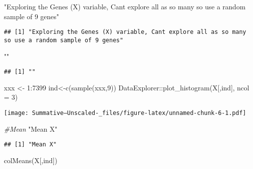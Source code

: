 \documentclass[
]{article}
\newenvironment{Shaded}{\begin{snugshade}}{\end{snugshade}}
\newcommand{\AttributeTok}[1]{\textcolor[rgb]{0.77,0.63,0.00}{#1}}
\newcommand{\CommentTok}[1]{\textcolor[rgb]{0.56,0.35,0.01}{\textit{#1}}}
\newcommand{\DecValTok}[1]{\textcolor[rgb]{0.00,0.00,0.81}{#1}}
\newcommand{\FunctionTok}[1]{\textcolor[rgb]{0.00,0.00,0.00}{#1}}
\newcommand{\NormalTok}[1]{#1}
\newcommand{\OtherTok}[1]{\textcolor[rgb]{0.56,0.35,0.01}{#1}}
\newcommand{\SpecialCharTok}[1]{\textcolor[rgb]{0.00,0.00,0.00}{#1}}
\newcommand{\StringTok}[1]{\textcolor[rgb]{0.31,0.60,0.02}{#1}}
\begin{document}
\begin{Shaded}
\begin{Highlighting}[]
\StringTok{"Exploring the Genes (X) variable, Cant explore all as so many so use a random sample of 9 genes"}
\end{Highlighting}
\end{Shaded}

\begin{verbatim}
## [1] "Exploring the Genes (X) variable, Cant explore all as so many so use a random sample of 9 genes"
\end{verbatim}

\begin{Shaded}
\begin{Highlighting}[]
\StringTok{""}
\end{Highlighting}
\end{Shaded}

\begin{verbatim}
## [1] ""
\end{verbatim}

\begin{Shaded}
\begin{Highlighting}[]
\NormalTok{xxx }\OtherTok{\textless{}{-}} \DecValTok{1}\SpecialCharTok{:}\DecValTok{7399}
\NormalTok{ind}\OtherTok{\textless{}{-}}\FunctionTok{c}\NormalTok{(}\FunctionTok{sample}\NormalTok{(xxx,}\DecValTok{9}\NormalTok{))}
\NormalTok{DataExplorer}\SpecialCharTok{::}\FunctionTok{plot\_histogram}\NormalTok{(X[,ind], }\AttributeTok{ncol =} \DecValTok{3}\NormalTok{)}
\end{Highlighting}
\end{Shaded}

\texttt{[image: Summative--Unscaled-\_files/figure-latex/unnamed-chunk-6-1.pdf]}

\begin{Shaded}
\begin{Highlighting}[]
\CommentTok{\#Mean}
\StringTok{"Mean X"}
\end{Highlighting}
\end{Shaded}

\begin{verbatim}
## [1] "Mean X"
\end{verbatim}

\begin{Shaded}
\begin{Highlighting}[]
\FunctionTok{colMeans}\NormalTok{(X[,ind])}
\end{Highlighting}
\end{Shaded}
\end{document}
